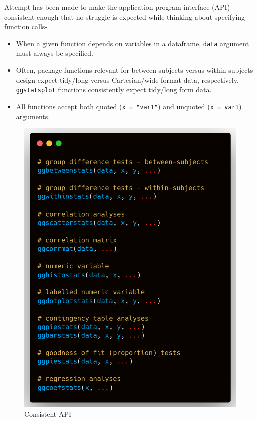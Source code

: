 \documentclass[]{article}
\providecommand{\tightlist}{%
  \setlength{\itemsep}{0pt}\setlength{\parskip}{0pt}}
\begin{document}
Attempt has been made to make the application program interface (API) consistent
enough that no struggle is expected while thinking about specifying function
calls-

\begin{itemize}
\tightlist
\item
  When a given function depends on variables in a dataframe, \texttt{data} argument
  must always be specified.
\item
  Often, package functions relevant for between-subjects versus
  within-subjects design expect tidy/long versus Cartesian/wide format data,
  respectively. \texttt{ggstatsplot} functions consistently expect tidy/long form
  data.
\item
  All functions accept both quoted (\texttt{x\ =\ "var1"}) and unquoted (\texttt{x\ =\ var1})
  arguments.
\end{itemize}

\begin{figure}
\centering
\includegraphics{figures/arguments.png}
\caption{Consistent API}
\end{figure}
\end{document}
